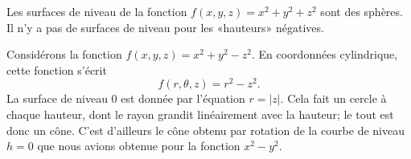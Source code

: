 \begin{example}
    Les surfaces de niveau de la fonction $f(x,y,z)=x^2+y^2+z^2$ sont des sphères. Il n'y a pas de surfaces de niveau pour les «hauteurs» négatives.
\end{example}

\begin{example}
    Considérons la fonction $f(x,y,z)=x^2+y^2-z^2$. En coordonnées cylindrique, cette fonction s'écrit
    \begin{equation}
        f(r,\theta,z)=r^2-z^2.
    \end{equation}
    La surface de niveau $0$ est donnée par l'équation $r=| z |$. Cela fait un cercle à chaque hauteur, dont le rayon grandit linéairement avec la hauteur; le tout est donc un cône. C'est d'ailleurs le cône obtenu par rotation de la courbe de niveau $h=0$ que nous avions obtenue pour la fonction $x^2-y^2$.


\end{example}
